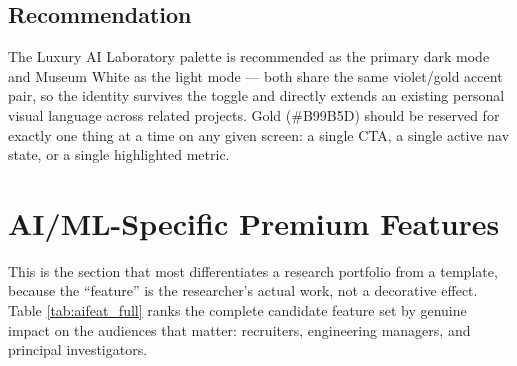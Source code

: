 \documentclass[conference]{IEEEtran}
\begin{document}
\subsection{Recommendation}
The Luxury AI Laboratory palette is recommended as the primary dark mode and Museum White as the light mode --- both share the same violet/gold accent pair, so the identity survives the toggle and directly extends an existing personal visual language across related projects. Gold (\#B99B5D) should be reserved for exactly one thing at a time on any given screen: a single CTA, a single active nav state, or a single highlighted metric.

\section{AI/ML-Specific Premium Features}

This is the section that most differentiates a research portfolio from a template, because the ``feature'' is the researcher's actual work, not a decorative effect. Table \ref{tab:aifeat_full} ranks the complete candidate feature set by genuine impact on the audiences that matter: recruiters, engineering managers, and principal investigators.
\end{document}
